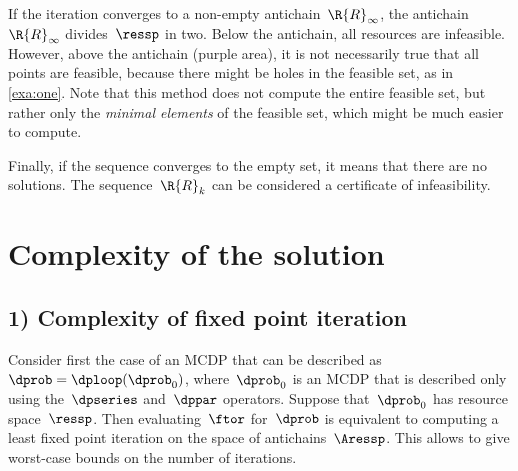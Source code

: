 If the iteration converges to a non-empty antichain~$\R{R}_{\infty}$,
the antichain~$\R{R}_{\infty}$ divides~$\ressp$ in two. Below
the antichain, all resources are infeasible. However, above the antichain
(purple area), it is not necessarily true that all points are feasible,
because there might be holes in the feasible set, as in \cref{exa:one}.
Note that this method does not compute the entire feasible set, but
rather only the \emph{minimal elements} of the feasible set, which
might be much easier to compute.

Finally, if the sequence converges to the empty set, it means that
there are no solutions. The sequence~$\R{R}_{k}$ can be considered
a certificate of infeasibility.

\section{Complexity of the solution }


\subsection{1) Complexity of fixed point iteration}

Consider first the case of an MCDP that can be described as~$\dprob=\dploop(\dprob_{0})$,
where~$\dprob_{0}$ is an MCDP that is described only using the~$\dpseries$
and~$\dppar$ operators. Suppose that~$\dprob_{0}$ has resource
space~$\ressp$. Then evaluating~$\ftor$ for~$\dprob$ is equivalent
to computing a least fixed point iteration on the space of antichains~$\Aressp$.
This allows to give worst-case bounds on the number of iterations.

